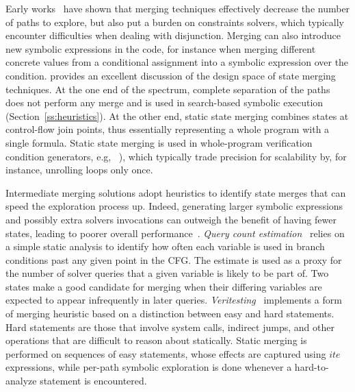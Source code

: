  Early works~\cite{G-POPL07,HSS-RV09} have shown that merging techniques effectively decrease the number of paths to explore, but also put a burden on constraints solvers, which typically encounter difficulties when dealing with disjunction. Merging can also introduce new symbolic expressions in the code, for instance when merging different concrete values from a conditional assignment into a symbolic expression over the condition. \cite{KKB-PLDI12} provides an excellent discussion of the design space of state merging techniques. At the one end of the spectrum, complete separation of the paths does not perform any merge and is used in search-based symbolic execution (Section~\ref{ss:heuristics}). At the other end, static state merging combines states at control-flow join points, thus essentially representing a whole program with a single formula. Static state merging is used in whole-program verification condition generators, e.g, ~\cite{SATURN-POPL05,CALYSTO-ICSE08}), which typically trade precision for scalability by, for instance, unrolling loops only once.



 Intermediate merging solutions adopt heuristics to identify state merges that can speed the exploration process up. Indeed, generating larger symbolic expressions and possibly extra solvers invocations can outweigh the benefit of having fewer states, leading to poorer overall performance~\cite{HSS-RV09,KKB-PLDI12}. {\em Query count estimation}~\cite{KKB-PLDI12} relies on a simple static analysis to identify how often each variable is used in branch conditions past any given point in the CFG. The estimate is used as a proxy for the number of solver queries that a given variable is likely to be part of. Two states make a good candidate for merging when their differing variables are expected to appear infrequently in later queries. {\em Veritesting}~\cite{VERITESTING-ICSE14} implements a form of merging heuristic based on a distinction between easy and hard statements. Hard statements are those that involve system calls, indirect jumps, and other operations that are difficult to reason about statically. Static merging is performed on sequences of easy statements, %
whose effects are captured using $ite$ expressions, 
while per-path symbolic exploration is done whenever a hard-to-analyze statement is encountered. 

